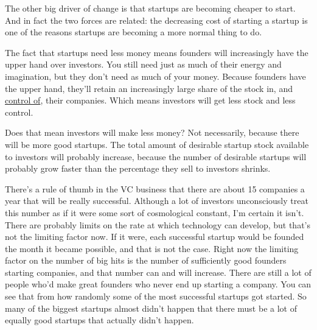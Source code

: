                   The other big driver of change is that startups are becoming
                  cheaper to start. And in fact the two forces are related: the
                  decreasing cost of starting a startup is one of the reasons
                  startups are becoming a more normal thing to do.

The
                  fact that startups need less money means founders will
                  increasingly have the upper hand over investors. You still
                  need just as much of their energy and imagination, but they
                  don't need as much of your money. Because founders have the
                  upper hand, they'll retain an increasingly large share of the
                  stock in, and \href{http://www.paulgraham.com/control.html}{control of}, their
                  companies. Which means investors will get less stock and less
                  control.

Does that mean investors will make less
                  money? Not necessarily, because there will be more good
                  startups. The total amount of desirable startup stock
                  available to investors will probably increase, because the
                  number of desirable startups will probably grow faster than
                  the percentage they sell to investors shrinks.

There's
                  a rule of thumb in the VC business that there are about 15
                  companies a year that will be really successful. Although a
                  lot of investors unconsciously treat this number as if it were
                  some sort of cosmological constant, I'm certain it isn't.
                  There are probably limits on the rate at which technology can
                  develop, but that's not the limiting factor now. If it were,
                  each successful startup would be founded the month it became
                  possible, and that is not the case. Right now the limiting
                  factor on the number of big hits is the number of sufficiently
                  good founders starting companies, and that number can and will
                  increase. There are still a lot of people who'd make great
                  founders who never end up starting a company. You can see that
                  from how randomly some of the most successful startups got
                  started. So many of the biggest startups almost didn't happen
                  that there must be a lot of equally good startups that
                  actually didn't happen.

